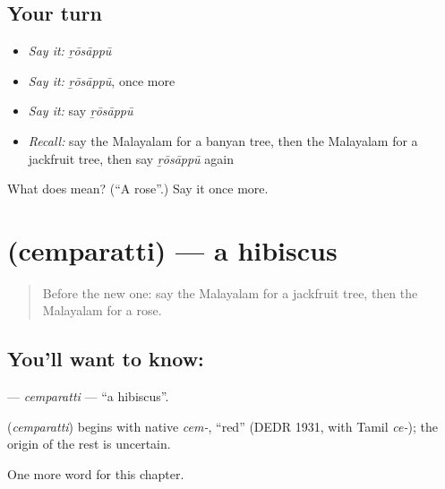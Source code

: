 \subsection*{Your turn}
\begin{itemize}
\raggedright
  \item \emph{Say it:} \emph{ṟōsāppū}
  \item \emph{Say it:} \emph{ṟōsāppū}, once more
  \item \emph{Say it:} say \emph{ṟōsāppū}
  \item \emph{Recall:} say the Malayalam for a banyan tree, then the Malayalam for a jackfruit tree, then say \emph{ṟōsāppū} again
\end{itemize}

\begin{tcolorbox}[breakable,colback=teal!4,colframe=teal!35!black,title={Before you move on}]
What does  mean? (\textquotedblleft{}A rose\textquotedblright{}.) Say it once more.
\end{tcolorbox}
\section[\texorpdfstring{\ml{ചെമ്പരത്തി} (cemparatti)}{ചെമ്പരത്തി (cemparatti)}]{ (cemparatti) — a hibiscus}

\label{lesson:ML-C253-cemparatti}



\begin{quote}
Before the new one: say the Malayalam for a jackfruit tree, then the Malayalam for a rose.
\end{quote}

\subsection*{You'll want to know: }
\textbf{} — \emph{cemparatti} — \textquotedblleft{}a hibiscus\textquotedblright{}.

\begin{cousinweb}
\textbf{} (\emph{cemparatti}) begins with native \emph{cem-}, \textquotedblleft{}red\textquotedblright{} (DEDR 1931, with Tamil \emph{ce-}); the origin of the rest is uncertain.
\end{cousinweb}

\begin{grammarlens}[title={What you've built}]
One more word for this chapter.
\end{grammarlens}

